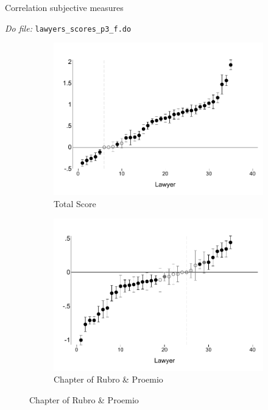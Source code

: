 \documentclass[oneside,11pt]{article}
\begin{document}
\begin{table}[H]
    \caption{Correlation subjective measures}
    \label{scores_cor}
     \begin{center}
    \scriptsize{}
    \end{center}
  \scriptsize{ \noindent 
    \textit{Do file: }  \texttt{lawyers\_scores\_p3\_f.do}}
\end{table}



\begin{figure}[H] 
    \label{}
    \caption{Lawyer quality heterogeneity (subjective)}
     \begin{center}
      \begin{subfigure}{0.49\textwidth}
        \caption{Total Score}
        \centering
        \includegraphics[width=\textwidth]{Figuras/betasp3_ql_total.pdf}
    \end{subfigure}
    \begin{subfigure}{0.49\textwidth}
        \caption{Chapter of Rubro \& Proemio}
        \centering
        \includegraphics[width=\textwidth]{Figuras/betasp3_ql_calif_rubro_proemio.pdf}

\end{subfigure}
\end{center}
\end{figure}
\end{document}
